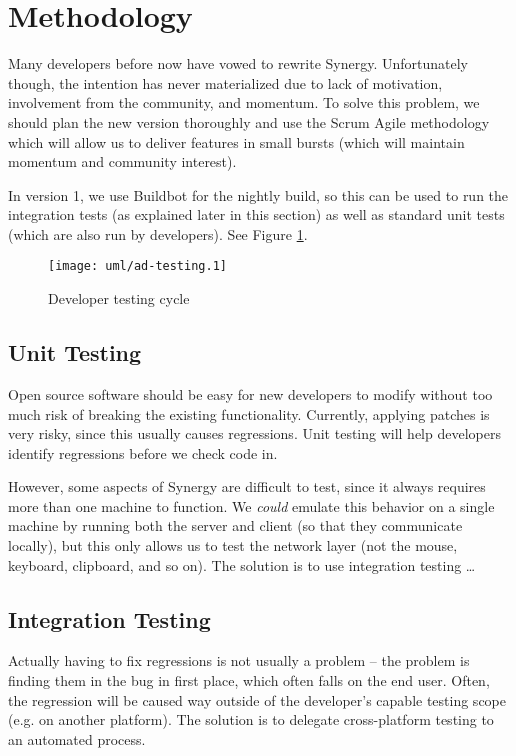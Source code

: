\section{Methodology}

Many developers before now have vowed to rewrite Synergy. Unfortunately though,
the intention has never materialized due to lack of motivation, involvement from
the community, and momentum.
To solve this problem, we should plan the new version thoroughly and use the
Scrum Agile methodology which will allow us to deliver features in small 
bursts (which will maintain momentum and community interest).

In version 1, we use Buildbot for the nightly build, so this can be used to run
the integration tests (as explained later in this section) as well as standard 
unit tests (which are also run by developers). See Figure \ref{fig:devTesting}.

\begin{figure}[ht!]
  \centering
  \texttt{[image: uml/ad-testing.1]}
  \caption{Developer testing cycle}
  \label{fig:devTesting}
\end{figure}

\subsection{Unit Testing}

Open source software should be easy for new developers to modify without too
much risk of breaking the existing functionality. Currently, applying patches 
is very risky, since this usually causes regressions. Unit testing will help 
developers identify regressions before we check code in.

However, some aspects of Synergy are difficult to test, since it always requires
more than one machine to function. We \textit{could} emulate this behavior on a 
single machine by running both the server and client (so that they communicate 
locally), but this only allows us to test the network layer (not the mouse,
keyboard, clipboard, and so on). The solution is to use integration testing
\ldots

\subsection{Integration Testing}

Actually having to fix regressions is not usually a problem -- the problem is
finding them in the bug in first place, which often falls on the end user. 
Often, the regression will be caused way outside of the developer's capable 
testing scope (e.g. on another platform). The solution is to delegate 
cross-platform testing to an automated process.

